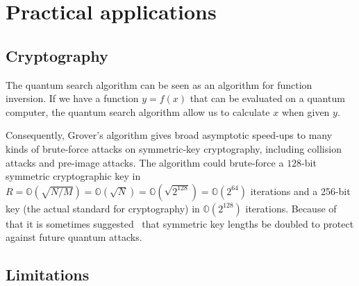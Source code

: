 \section{Practical applications}
\subsection{Cryptography}
The quantum search algorithm can be seen as an algorithm for function inversion. If we have a function $y=f(x)$ that can be evaluated on a quantum computer, the quantum search algorithm allow us to calculate $x$ when given $y$.

Consequently, Grover's algorithm gives broad asymptotic speed-ups to many kinds of brute-force attacks on symmetric-key cryptography, including collision attacks and pre-image attacks.
The algorithm could brute-force a $128$-bit symmetric cryptographic key in $R = \mathbb{O} (\sqrt{N/M}) = \mathbb{O} (\sqrt{N}) = \mathbb{O} (\sqrt{2^{128}}) = \mathbb{O} (2^{64})$ iterations and a 256-bit key (the actual standard for cryptography) in $\mathbb{O} (2^{128})$ iterations. Because of that  it is sometimes suggested~\cite{10.1007/978-3-642-12929-2_6} that symmetric key lengths be doubled to protect against future quantum attacks.
\subsection{Limitations}